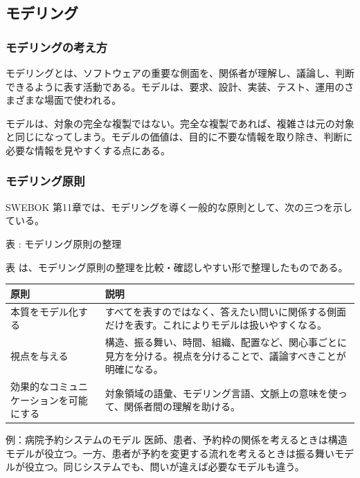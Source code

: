 \subsection{モデリング}
\subsubsection{モデリングの考え方}
モデリングとは、ソフトウェアの重要な側面を、関係者が理解し、議論し、判断できるように表す活動である。モデルは、要求、設計、実装、テスト、運用のさまざまな場面で使われる。

モデルは、対象の完全な複製ではない。完全な複製であれば、複雑さは元の対象と同じになってしまう。モデルの価値は、目的に不要な情報を取り除き、判断に必要な情報を見やすくする点にある。

\subsubsection{モデリング原則}
SWEBOK 第11章では、モデリングを導く一般的な原則として、次の三つを示している。

\par\smallskip\noindent{}\label{tab:ch11-02}表 \thetable: モデリング原則の整理\par\smallskip
表 \thetable は、モデリング原則の整理を比較・確認しやすい形で整理したものである。\par\smallskip
\begin{longtable}{>{\raggedright\arraybackslash}p{}>{\raggedright\arraybackslash}p{}}
\toprule
原則 & 説明 \\
\midrule
本質をモデル化する & すべてを表すのではなく、答えたい問いに関係する側面だけを表す。これによりモデルは扱いやすくなる。\\
視点を与える & 構造、振る舞い、時間、組織、配置など、関心事ごとに見方を分ける。視点を分けることで、議論すべきことが明確になる。\\
効果的なコミュニケーションを可能にする & 対象領域の語彙、モデリング言語、文脈上の意味を使って、関係者間の理解を助ける。\\
\bottomrule
\end{longtable}

\begin{pointbox}{例：病院予約システムのモデル}
医師、患者、予約枠の関係を考えるときは構造モデルが役立つ。一方、患者が予約を変更する流れを考えるときは振る舞いモデルが役立つ。同じシステムでも、問いが違えば必要なモデルも違う。
\end{pointbox}

